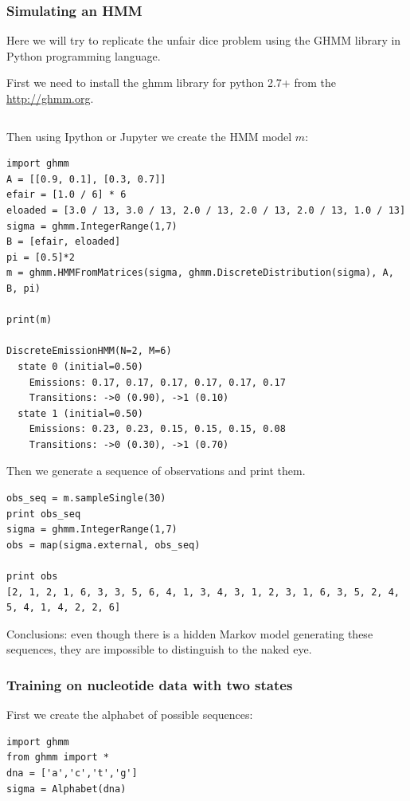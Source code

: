 \documentclass[a4paper,12pt]{article}
\theoremstyle{definition}
\begin{document}
\subsubsection{Simulating an HMM}\label{app:simHMM}
Here we will try to replicate the unfair dice problem using the GHMM library in Python programming language. 

First we need to install the ghmm library for python 2.7+ from the \href{http://ghmm.org}{http://ghmm.org}.
\begin{lstlisting}

\end{lstlisting}

Then using Ipython or Jupyter we create the HMM model $m$:

\begin{lstlisting}
import ghmm
A = [[0.9, 0.1], [0.3, 0.7]]
efair = [1.0 / 6] * 6
eloaded = [3.0 / 13, 3.0 / 13, 2.0 / 13, 2.0 / 13, 2.0 / 13, 1.0 / 13]
sigma = ghmm.IntegerRange(1,7)
B = [efair, eloaded]
pi = [0.5]*2
m = ghmm.HMMFromMatrices(sigma, ghmm.DiscreteDistribution(sigma), A, B, pi)

print(m)

DiscreteEmissionHMM(N=2, M=6)
  state 0 (initial=0.50)
    Emissions: 0.17, 0.17, 0.17, 0.17, 0.17, 0.17
    Transitions: ->0 (0.90), ->1 (0.10)
  state 1 (initial=0.50)
    Emissions: 0.23, 0.23, 0.15, 0.15, 0.15, 0.08
    Transitions: ->0 (0.30), ->1 (0.70)
\end{lstlisting}

Then we generate a sequence of observations and print them. 
\begin{lstlisting}
obs_seq = m.sampleSingle(30)
print obs_seq
sigma = ghmm.IntegerRange(1,7)
obs = map(sigma.external, obs_seq)

print obs
[2, 1, 2, 1, 6, 3, 3, 5, 6, 4, 1, 3, 4, 3, 1, 2, 3, 1, 6, 3, 5, 2, 4, 5, 4, 1, 4, 2, 2, 6]
\end{lstlisting}
Conclusions: even though there is a hidden Markov model generating these sequences, they are impossible to distinguish to the naked eye. 

\subsubsection{Training on nucleotide data with two states}
First we create the alphabet of possible sequences:
\begin{lstlisting}
import ghmm
from ghmm import *
dna = ['a','c','t','g']
sigma = Alphabet(dna)
\end{lstlisting}
\end{document}
